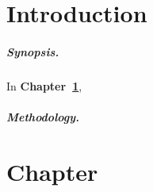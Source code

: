 \documentclass[11pt,a4paper,twoside,openany]{report}
\newcommand\declarationpage{}
\newcommand\acknowledgementspage{}
\newcommand\abstractpage{}
\begin{document}
    
    \begin{titlepage}
        
    \end{titlepage}

    \newpage\blankpage

    







    \tableofcontents

    \chapter*{Introduction}
    \label{chap:introduction}
    
    \lipsum[1-2]

    \paragraph*{Synopsis.} In \textbf{Chapter~\ref{chap:first-chapter}}, \lipsum[3]

    \paragraph*{Methodology.} \lipsum[4]


    \chapter{Chapter}
    \label{chap:first-chapter}
\end{document}
